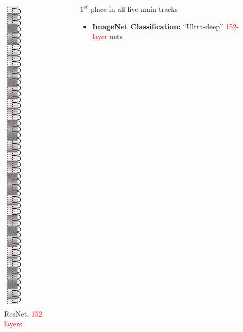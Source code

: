 			
\begin{frame}
	\begin{columns}
		\begin{overlayarea}{\textwidth}{\textheight}
			\vspace{0.3cm}
			\begin{figure}
				\begin{center}
					\includegraphics[scale=0.29]{images/resNet_layers.png}
					\caption*{ResNet, \textcolor{red} {152 layers}}
				\end{center}
			\end{figure}
		\end{overlayarea}
		\begin{overlayarea}{\textwidth}{\textheight}
			\begin{block}{$1^{st}$ place in all five main tracks}
				\begin{itemize}
					\justifying
					\item<1-> \textbf{ImageNet Classification:}\hspace{-2mm} ``Ultra-deep'' \textcolor{red}{152-layer} nets

\end{itemize}
\end{block}
\end{overlayarea}
\end{columns}
\end{frame}
